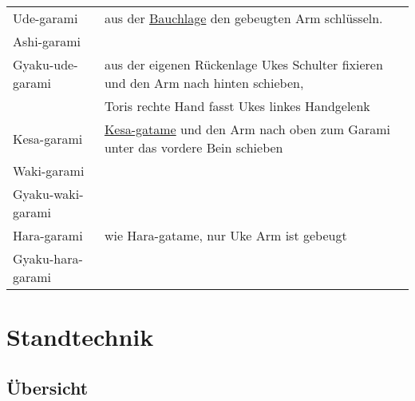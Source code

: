\documentclass[justified, a4paper, notitlepage, captions=tableheading, nobib]{tufte-handout}
\begin{document}
\begin{enumerate}
\begin{center}
\begin{tabular}{ll}
\label{org52f11cf}Ude-garami & aus der \hyperref[org22fd945]{Bauchlage} den gebeugten Arm schlüsseln.\\
\label{org66e3f90}Ashi-garami & \\
\label{org0c41154}Gyaku-ude-garami & aus der eigenen Rückenlage Ukes Schulter fixieren und den Arm nach hinten schieben,\\
 & Toris rechte Hand fasst Ukes linkes Handgelenk\\
\label{org8e9c384}Kesa-garami & \hyperref[org5004057]{Kesa-gatame} und den Arm nach oben zum Garami unter das vordere Bein schieben\\
\label{orgd437243}Waki-garami & \\
\label{org503d226}Gyaku-waki-garami & \\
\label{org453d5db}Hara-garami & wie Hara-gatame, nur Uke Arm ist gebeugt\\
\label{org6a75ace}Gyaku-hara-garami & \\
\end{tabular}
\end{center}

\newpage
\end{enumerate}
\section{Standtechnik }
\label{sec:org11ec6cd}

\subsection{Übersicht}
\label{sec:orgdf1b0dd}
\end{document}
